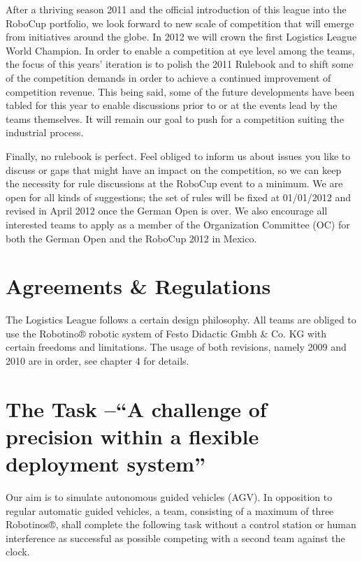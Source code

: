 \documentclass[12pt,twoside]{article}
\begin{document}
After a thriving season 2011 and the official introduction of this
league into the RoboCup portfolio, we look forward to new scale of
competition that will emerge from initiatives around the globe. In
2012 we will crown the first Logistics League World Champion. In order
to enable a competition at eye level among the teams, the focus of
this years’ iteration is to polish the 2011 Rulebook and to shift some
of the competition demands in order to achieve a continued improvement
of competition revenue. This being said, some of the future
developments have been tabled for this year to enable discussions
prior to or at the events lead by the teams themselves. It will remain
our goal to push for a competition suiting the industrial process.

Finally, no rulebook is perfect. Feel obliged to inform us about
issues you like to discuss or gaps that might have an impact on the
competition, so we can keep the necessity for rule discussions at the
RoboCup event to a minimum. We are open for all kinds of suggestions;
the set of rules will be fixed at 01/01/2012 and revised in April 2012
once the German Open is over. We also encourage all interested teams
to apply as a member of the Organization Committee (OC) for both the
German Open and the RoboCup 2012 in Mexico.



\section{Agreements \& Regulations}

The Logistics League follows a certain design philosophy. All teams
are obliged to use the Robotino® robotic system of Festo Didactic Gmbh
\& Co. KG with certain freedoms and limitations. The usage of both
revisions, namely 2009 and 2010 are in order, see chapter 4 for
details.


\section{The Task –“A challenge of precision within a flexible
  deployment system”}

Our aim is to simulate autonomous guided vehicles (AGV). In opposition
to regular automatic guided vehicles, a team, consisting of a maximum
of three Robotinos®, shall complete the following task without a
control station or human interference as successful as possible
competing with a second team against the clock.
\end{document}

